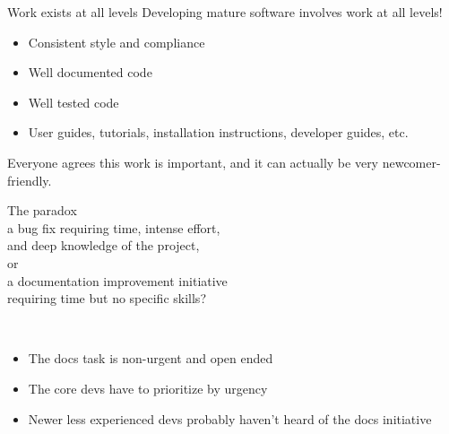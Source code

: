 \documentclass{beamer}
\begin{document}
\begin{frame}
	\centering
\end{frame}

\begin{frame}{Work exists at all levels}
Developing mature software involves work at all levels!\\[8pt]

\begin{itemize}
	\item Consistent style and  compliance
	\item Well documented code
	\item Well tested code
	\item User guides, tutorials, installation instructions, developer guides, etc.
\end{itemize}

\vskip10pt
Everyone agrees this work is important, and it can actually be very newcomer-friendly.
\end{frame}

\begin{frame}{The paradox}
	\\[10pt]
	
	\centering
	a bug fix requiring time, intense effort,\\ and deep knowledge of the project,\\
	\alert{or}\\
	a documentation improvement initiative\\ requiring time but no specific skills?\\
	\vskip10pt
	\raggedright
	
	\\
	
	\begin{itemize}
		\item The docs task is non-urgent and open ended
		\item The core devs have to prioritize by urgency
		\item Newer less experienced devs probably haven't heard of the docs initiative
	\end{itemize}

 \end{frame}
\end{document}
